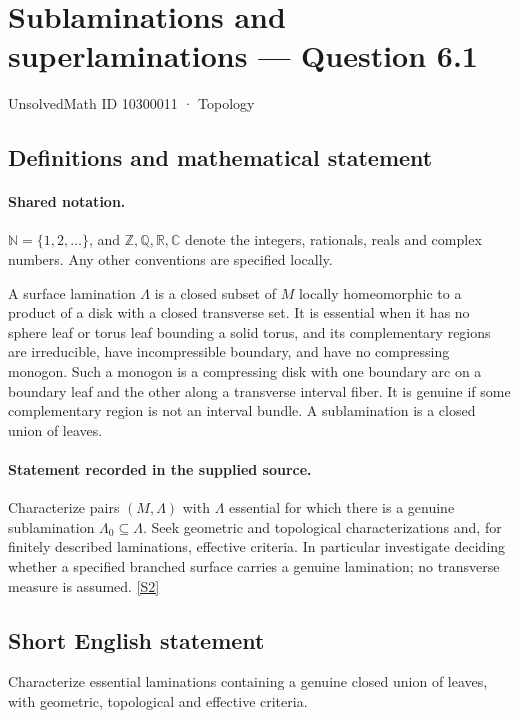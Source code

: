 \documentclass[11pt]{article}
\newcommand{\sref}[2]{\hyperlink{source:#1:#2}{[S#2]}}
\begin{document}
\setcounter{section}{10300010}
\section{Sublaminations and superlaminations — Question 6.1}\label{10300011}
{\small\sffamily UnsolvedMath ID 10300011 · Topology}
\subsection{Definitions and mathematical statement}

\paragraph{Shared notation.}$\mathbb N=\{1,2,\ldots\}$, and $\mathbb Z,\mathbb Q,\mathbb R,\mathbb C$ denote the integers, rationals, reals and complex numbers. Any other conventions are specified locally.


A surface lamination $\Lambda$ is a closed subset of $M$ locally homeomorphic to a product of a disk with a closed transverse set. It is essential when it has no sphere leaf or torus leaf bounding a solid torus, and its complementary regions are irreducible, have incompressible boundary, and have no compressing monogon. Such a monogon is a compressing disk with one boundary arc on a boundary leaf and the other along a transverse interval fiber. It is genuine if some complementary region is not an interval bundle. A sublamination is a closed union of leaves.
\paragraph{Statement recorded in the supplied source.}
Characterize pairs $(M,\Lambda)$ with $\Lambda$ essential for which there is a genuine sublamination $\Lambda_0\subseteq\Lambda$. Seek geometric and topological characterizations and, for finitely described laminations, effective criteria. In particular investigate deciding whether a specified branched surface carries a genuine lamination; no transverse measure is assumed. \sref{10300011}{2}
\subsection{Short English statement}
Characterize essential laminations containing a genuine closed union of leaves, with geometric, topological and effective criteria.
\end{document}
